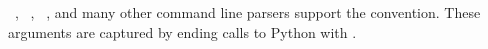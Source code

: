 ~\cite{argparse}, ~\cite{click}, ~\cite{python_fire}, and many other command line parsers support the  convention. These arguments are captured by ending calls to Python with .